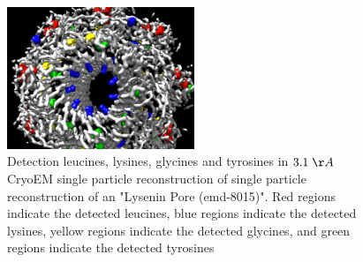 \begin{figure}
  \caption{Detection leucines, lysines, glycines and tyrosines  in  $3.1 \; \AA$ CryoEM single particle reconstruction of single particle reconstruction of an "Lysenin Pore (emd-8015)". Red regions indicate the detected {\color{red} leucines}, blue regions indicate the detected {\color{blue} lysines}, yellow regions indicate the detected {\color{yellow} glycines}, and green regions indicate the detected {\color{green} tyrosines} } \label{f:LYS31}
  \centering
    \includegraphics[width=0.5\textwidth]{pics/lys_pore_GLY_LEU_LYS_TYR.png}
\end{figure}







